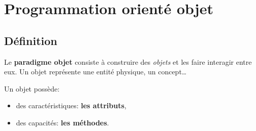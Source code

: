 \documentclass[a4paper,11pt]{article}
\begin{document}
\section{Programmation orienté objet}
\subsection{Définition}
Le \textbf{paradigme objet} consiste à construire des \emph{objets} et les faire interagir entre eux. Un objet représente une entité physique, un concept\dots 
\begin{aretenir}[]
    Un objet possède:
    \begin{itemize}
        \item des caractéristiques: \textbf{les attributs},
        \item des capacités: \textbf{les méthodes}.
    \end{itemize}
\end{aretenir}
\end{document}
